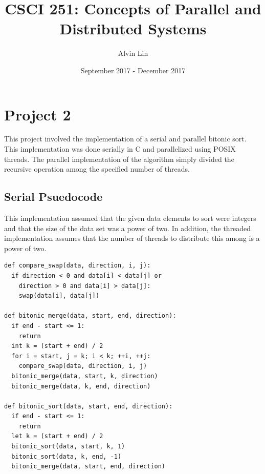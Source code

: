\documentclass{math}
\title{CSCI 251: Concepts of Parallel and Distributed Systems}
\author{Alvin Lin}
\date{September 2017 - December 2017}
\begin{document}
\maketitle

\section*{Project 2}
This project involved the implementation of a serial and parallel bitonic sort.
This implementation was done serially in C and parallelized using POSIX threads.
The parallel implementation of the algorithm simply divided the recursive
operation among the specified number of threads.

\subsection*{Serial Psuedocode}
This implementation assumed that the given data elements to sort were integers
and that the size of the data set was a power of two. In addition, the threaded
implementation assumes that the number of threads to distribute this among is a
power of two.
\begin{lstlisting}
def compare_swap(data, direction, i, j):
  if direction < 0 and data[i] < data[j] or
    direction > 0 and data[i] > data[j]:
    swap(data[i], data[j])

def bitonic_merge(data, start, end, direction):
  if end - start <= 1:
    return
  int k = (start + end) / 2
  for i = start, j = k; i < k; ++i, ++j:
    compare_swap(data, direction, i, j)
  bitonic_merge(data, start, k, direction)
  bitonic_merge(data, k, end, direction)

def bitonic_sort(data, start, end, direction):
  if end - start <= 1:
    return
  let k = (start + end) / 2
  bitonic_sort(data, start, k, 1)
  bitonic_sort(data, k, end, -1)
  bitonic_merge(data, start, end, direction)
\end{lstlisting}
\end{document}
